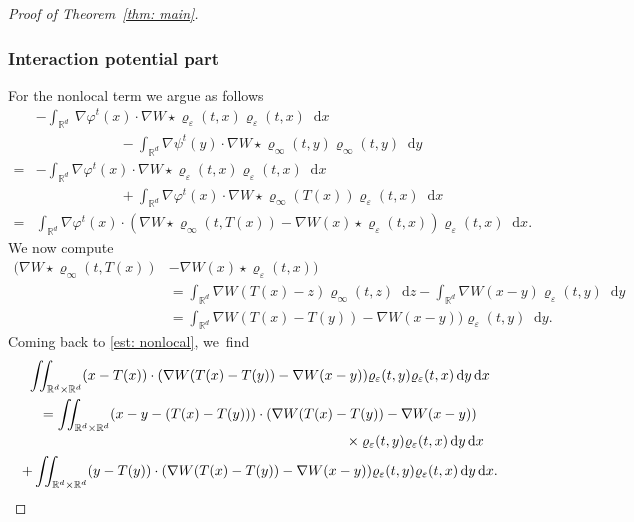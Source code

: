 \documentclass[JEP,XML,SOM,Unicode,published]{cedram}
\newcommand{\dx}[1]{\mathop{}\!\mathrm{d} #1}
\newcommand{\R}{\mathbb{R}}
\theoremstyle{plain}
\theoremstyle{remark}
\begin{document}
\begin{proof}[Proof of Theorem~\ref{thm: main}]
\subsubsection*{Interaction potential part}
For the nonlocal term we argue as follows\vspace*{-3pt}
\begin{equation}\label{est: nonlocal}
\begin{split}
&- \int_{\R^d}\!\ \nabla \varphi^t (x) \cdot \nabla W\star \varrho_\varepsilon (t,x) \varrho_\varepsilon(t,x) \dx x\\
&\qquad\qquad\qquad - \int_{\R^d} \nabla \psi^t (y) \cdot \nabla W\star \varrho_\infty (t,y) \varrho_\infty(t,y) \dx y\\
=&- \int_{\R^d} \nabla \varphi^t (x) \cdot \nabla W\star \varrho_\varepsilon (t,x) \varrho_\varepsilon(t,x) \dx x\\[0.2em]
&\qquad\qquad\qquad+ \int_{\R^d} \nabla \varphi^t (x) \cdot \nabla W\star \varrho_\infty (T(x)) \varrho_\varepsilon(t,x) \dx x\\
=&\int_{\R^d} \nabla \varphi^t (x) \cdot (\nabla W\star \varrho_\infty (t,T(x)) - \nabla W(x) \star\varrho_\varepsilon(t,x)) \varrho_\varepsilon(t,x) \dx x.
\end{split}
\end{equation}
We now compute
\begin{equation*}
\begin{aligned}
(\nabla W\star \varrho_\infty (t,T(x)) &- \nabla W(x) \star\varrho_\varepsilon(t,x))\\
&= \int_{\R^d} \nabla W(T(x)-z) \varrho_\infty(t,z) \dx z - \int_{\R^d} \nabla W(x-y) \varrho_\varepsilon(t,y) \dx y\\
&= \int_{\R^d} \nabla W(T(x)-T(y)) - \nabla W(x-y) )\varrho_\varepsilon(t,y) \dx y.
\end{aligned}
\end{equation*}
Coming back to \eqref{est: nonlocal}, we~find\vspace*{-5pt}
\begin{multline*}
\iint_{\R^d\times\R^d} (x- T(x))\cdot (\nabla W(T(x)-T(y)) - \nabla W(x-y)) \varrho_\varepsilon(t,y) \varrho_\varepsilon(t,x) \dx y \dx x\\
=\iint_{\R^d\times\R^d} (x-y - (T(x)-T(y)))\cdot (\nabla W(T(x)-T(y)) - \nabla W(x-y))\\[-3pt]
\shoveright{{}\times \varrho_\varepsilon(t,y) \varrho_\varepsilon(t,x) \dx y \dx x}\\
+ \iint_{\R^d\times\R^d} (y -T(y))\cdot (\nabla W(T(x)-T(y)) - \nabla W(x-y)) \varrho_\varepsilon(t,y) \varrho_\varepsilon(t,x) \dx y \dx x.

\end{multline*}
\end{proof}
\end{document}
